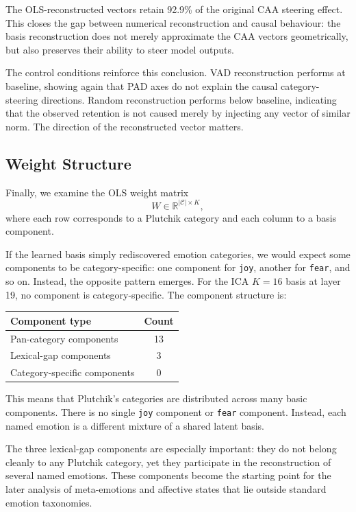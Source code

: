 \documentclass[12pt,twoside]{report}
\begin{document}
The OLS-reconstructed vectors retain 92.9\% of the original CAA steering effect. This closes the gap between numerical reconstruction and causal behaviour: the basis reconstruction does not merely approximate the CAA vectors geometrically, but also preserves their ability to steer model outputs.

The control conditions reinforce this conclusion. VAD reconstruction performs at baseline, showing again that PAD axes do not explain the causal category-steering directions. Random reconstruction performs below baseline, indicating that the observed retention is not caused merely by injecting any vector of similar norm. The direction of the reconstructed vector matters.

\subsection{Weight Structure}
\label{sec:emotion_code:caa_basis_decomposition:weights}

Finally, we examine the OLS weight matrix
\[
W\in\mathbb{R}^{|\mathcal{C}|\times K},
\]
where each row corresponds to a Plutchik category and each column to a basis component.

If the learned basis simply rediscovered emotion categories, we would expect some components to be category-specific: one component for \texttt{joy}, another for \texttt{fear}, and so on. Instead, the opposite pattern emerges. For the ICA $K=16$ basis at layer 19, no component is category-specific. The component structure is:
\begin{center}
\begin{tabular}{lc}
\toprule
Component type & Count \\
\midrule
Pan-category components & 13 \\
Lexical-gap components & 3 \\
Category-specific components & 0 \\
\bottomrule
\end{tabular}
\end{center}

This means that Plutchik's categories are distributed across many basic components. There is no single \texttt{joy} component or \texttt{fear} component. Instead, each named emotion is a different mixture of a shared latent basis.

The three lexical-gap components are especially important: they do not belong cleanly to any Plutchik category, yet they participate in the reconstruction of several named emotions. These components become the starting point for the later analysis of meta-emotions and affective states that lie outside standard emotion taxonomies.
\end{document}
